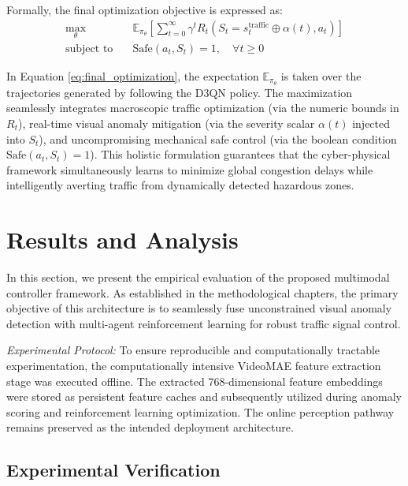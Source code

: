 \documentclass[conference]{IEEEtran}
\begin{document}
Formally, the final optimization objective is expressed as:
\begin{equation}
\begin{aligned}
\max_{\theta} \quad & \mathbb{E}_{\pi_\theta} \left[ \sum_{t=0}^{\infty} \gamma^t R_t\left( S_t = s_t^{\text{traffic}} \oplus \alpha(t), a_t \right) \right] \\
\text{subject to} \quad & \text{Safe}(a_t, S_t) = 1, \quad \forall t \geq 0
\end{aligned}
\label{eq:final_optimization}
\end{equation}

In Equation \ref{eq:final_optimization}, the expectation $\mathbb{E}_{\pi_\theta}$ is taken over the trajectories generated by following the D3QN policy. The maximization seamlessly integrates macroscopic traffic optimization (via the numeric bounds in $R_t$), real-time visual anomaly mitigation (via the severity scalar $\alpha(t)$ injected into $S_t$), and uncompromising mechanical safe control (via the boolean condition $\text{Safe}(a_t, S_t) = 1$). This holistic formulation guarantees that the cyber-physical framework simultaneously learns to minimize global congestion delays while intelligently averting traffic from dynamically detected hazardous zones.
\section{Results and Analysis}
\label{sec:results_analysis}

In this section, we present the empirical evaluation of the proposed multimodal controller framework. As established in the methodological chapters, the primary objective of this architecture is to seamlessly fuse unconstrained visual anomaly detection with multi-agent reinforcement learning for robust traffic signal control. 

\textit{Experimental Protocol:}
To ensure reproducible and computationally tractable experimentation, the computationally intensive VideoMAE feature extraction stage was executed offline. The extracted 768-dimensional feature embeddings were stored as persistent feature caches and subsequently utilized during anomaly scoring and reinforcement learning optimization. The online perception pathway remains preserved as the intended deployment architecture.

\subsection{Experimental Verification}
\label{subsec:exp_verification}
\end{document}
